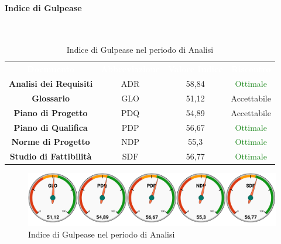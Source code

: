 \paragraph{Indice di Gulpease}\mbox{}\\[0,3cm]
\begin{table}[H]
	\centering
	\begin{tabular}{cccc}
	\rowcolor{greySWEight}
	\textcolor{white}{\textbf{Documento}} & 
	\textcolor{white}{\textbf{Abbreviazione}} &
	\textcolor{white}{\textbf{Valore Indice}}&
	\textcolor{white}{\textbf{Riscontro}}\\
	
	\textbf{Analisi dei Requisiti} & ADR & 58,84 & \textcolor{ForestGreen}{Ottimale} \\
	\textbf{Glossario} & GLO & 51,12 & \textcolor{YellowOrange}{Accettabile} \\
	\textbf{Piano di Progetto} & PDQ & 54,89 & \textcolor{YellowOrange}{Accettabile} \\
	\textbf{Piano di Qualifica} & PDP & 56,67 & \textcolor{ForestGreen}{Ottimale} \\
	\textbf{Norme di Progetto} & NDP & 55,3 & \textcolor{ForestGreen}{Ottimale} \\
	\textbf{Studio di Fattibilità} & SDF & 56,77 & \textcolor{ForestGreen}{Ottimale} \\

	\end{tabular}
	\caption{Indice di Gulpease nel periodo di Analisi}
\end{table}
\begin{figure}[H]
	\includegraphics[width=1\linewidth]{sez/App_Esito/graph/AN_Gulp.pdf}
	\caption{Indice di Gulpease nel periodo di Analisi}
\end{figure}

